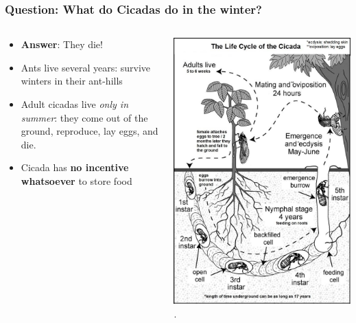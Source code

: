 \documentclass[aspectratio=169]{beamer}
\begin{document}
\begin{frame}[label=top]
    \frametitle{\Large{Question: What do Cicadas do in the winter?}}
    \begin{columns}
        \begin{column}{0.5\textwidth}
            \begin{itemize}
                \item \textbf{Answer}: They die! 
                \item Ants live several years: survive winters in their ant-hills
                \item Adult cicadas live \textit{only in summer}: they come out of the ground, reproduce, lay eggs, and die.  
                \newline
                \pause
                \item Cicada has \textbf{no incentive whatsoever} to store food
            \end{itemize}
        \end{column}
        \begin{column}{0.5\textwidth}  %
        \begin{center}
            \includegraphics[scale=0.16]{pics/cicada_life_cycle.jpg}.   

\end{center}
\end{column}
\end{columns}
\end{frame}
\end{document}
